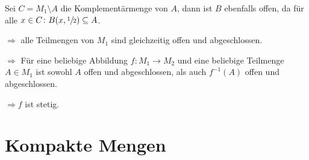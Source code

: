 \documentclass{scrreprt}
\begin{document}
\begin{enumerate}[(i)]
  Sei $C = M_1 \setminus A$ die Komplementärmenge von $A$, dann ist $B$
  ebenfalls offen, da für alle
  $x \in C \colon B\qty(x, \sfrac{1}{2}) \subseteq A$.

  $\Rightarrow$ alle Teilmengen von $M_1$ sind gleichzeitig offen und
  abgeschlossen.

  $\Rightarrow$ Für eine beliebige Abbildung $f \colon M_1 \to M_2$
  und eine beliebige Teilmenge $A \in M_1$ ist sowohl $A$ offen und
  abgeschlossen, als auch $f^{-1}(A)$ offen und abgeschlossen.

  $\Rightarrow f$ ist stetig.

\end{enumerate}

\section*{Kompakte Mengen}
\end{document}
